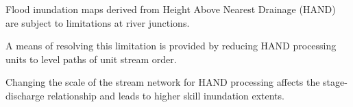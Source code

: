 

%
\begin{keypoints}
\item Flood inundation maps derived from Height Above Nearest Drainage (HAND) are subject to limitations at river junctions.
\item A means of resolving this limitation is provided by reducing HAND processing units to level paths of unit stream order.
\item Changing the scale of the stream network for HAND processing affects the stage-discharge relationship and leads to higher skill inundation extents.
\end{keypoints}
%
